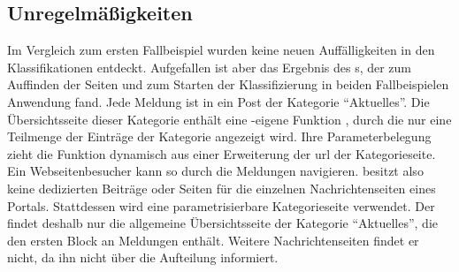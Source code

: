 \subsection{Unregelmäßigkeiten}
    Im Vergleich zum ersten Fallbeispiel
    wurden keine neuen Auffälligkeiten in den Klassifikationen entdeckt.
    Aufgefallen ist aber das Ergebnis des {\wordpressCrawler}s,
    der zum Auffinden der Seiten und zum Starten der Klassifizierung
    in beiden Fallbeispielen Anwendung fand.   
    Jede Meldung ist in {\wordpress} ein Post der Kategorie "`Aktuelles"'.
    Die Übersichtsseite dieser Kategorie enthält eine {\wordpress}-eigene
    Funktion \cite[Kapitel "`Pagination"']{wordpress:codex},
    durch die nur eine Teilmenge der Einträge der Kategorie angezeigt wird.
    Ihre Parameterbelegung zieht die Funktion dynamisch aus einer Erweiterung der
    \gls{url} der Kategorieseite.
    Ein Webseitenbesucher kann so durch die Meldungen navigieren.
    {\wordpress} besitzt also keine dedizierten Beiträge oder Seiten
    für die einzelnen Nachrichtenseiten eines Portals.
    Stattdessen wird eine parametrisierbare Kategorieseite verwendet.
    Der {\wordpressCrawler} findet deshalb nur die allgemeine Übersichtsseite der Kategorie "`Aktuelles"',
    die den ersten Block an Meldungen enthält.
    Weitere Nachrichtenseiten findet er nicht,
    da {\wordpress} ihn nicht über die Aufteilung informiert.
